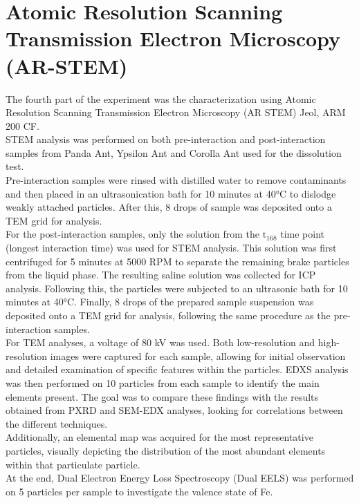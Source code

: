 \section{Atomic Resolution Scanning Transmission Electron Microscopy (AR-STEM)}

The fourth part of the experiment was the characterization using Atomic Resolution Scanning Transmission Electron Microscopy (AR STEM) Jeol, ARM 200 CF. \\
STEM analysis was performed on both pre-interaction and post-interaction samples from Panda Ant, Ypsilon Ant and Corolla Ant used for the dissolution test.\\
Pre-interaction samples were rinsed with distilled water to remove contaminants and then placed in an ultrasonication bath for 10 minutes at 40°C to dislodge weakly attached particles. After this, 8 drops of sample was deposited onto a TEM grid for analysis. \\
For the post-interaction samples, only the solution from the $\text{t}_{168}$ time point (longest interaction time) was used for STEM analysis. This solution was first centrifuged for 5 minutes at 5000 RPM to separate the remaining brake particles from the liquid phase. The resulting saline solution was collected for ICP analysis. Following this, the particles were subjected to an ultrasonic bath for 10 minutes at 40°C. Finally, 8 drops of the prepared sample suspension was deposited onto a TEM grid for analysis, following the same procedure as the pre-interaction samples. \\
For TEM analyses, a voltage of 80 kV was used. Both low-resolution and high-resolution images were captured for each sample, allowing for initial observation and detailed examination of specific features within the particles. EDXS analysis was then performed on 10 particles from each sample to identify the main elements present. The goal was to compare these findings with the results obtained from PXRD and SEM-EDX analyses, looking for correlations between the different techniques.\\ Additionally, an elemental map was acquired for the most representative particles, visually depicting the distribution of the most abundant elements within that particulate particle.\\
At the end, Dual Electron Energy Loss Spectroscopy (Dual EELS) was performed on 5 particles per sample to investigate the valence state of Fe.